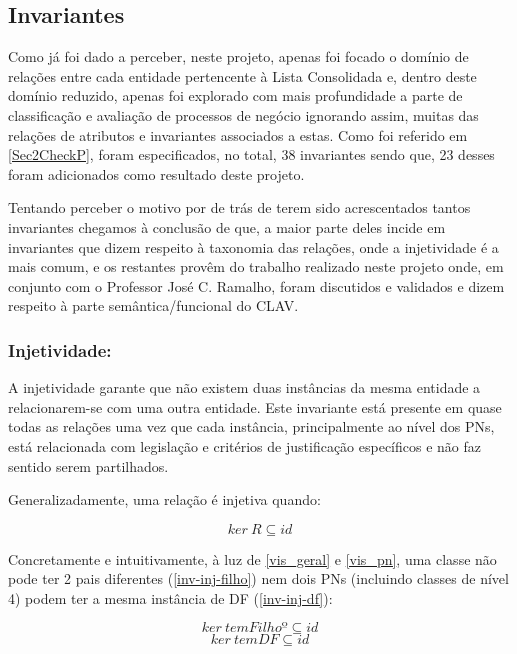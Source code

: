 \documentclass[tikz,runningheads,a4paper]{llncs}
\begin{document}
\subsection{Invariantes} \label{SubSecInv}

Como já foi dado a perceber, neste projeto, apenas foi focado o domínio de relações entre cada entidade pertencente à Lista Consolidada e, dentro deste domínio reduzido, apenas foi explorado com mais profundidade a parte de classificação e avaliação de processos de negócio ignorando assim, muitas das relações de atributos e invariantes associados a estas. Como foi referido em \ref{Sec2CheckP}, foram especificados, no total, 38 invariantes sendo que, 23 desses foram adicionados como resultado deste projeto.

Tentando perceber o motivo por de trás de terem sido acrescentados tantos invariantes chegamos à conclusão de que, a maior parte deles incide em invariantes que dizem respeito à taxonomia das relações, onde a injetividade é a mais comum, e os restantes provêm do trabalho realizado neste projeto onde, em conjunto com o Professor José C. Ramalho, foram discutidos e validados e dizem respeito à parte semântica/funcional do CLAV.

\subsubsection{Injetividade:}

A injetividade garante que não existem duas instâncias da mesma entidade a relacionarem-se com uma outra entidade. Este invariante está presente em quase todas as relações uma vez que cada instância, principalmente ao nível dos PNs, está relacionada com legislação e critérios de justificação específicos e não faz sentido serem partilhados.

Generalizadamente, uma relação é injetiva quando:

\begin{equation}
\label{injetivity}
    ker\ R \subseteq id
\end{equation}

Concretamente e intuitivamente, à luz de \ref{vis_geral} e \ref{vis_pn}, uma classe não pode ter 2 pais diferentes (\ref{inv-inj-filho}) nem dois PNs (incluindo classes de nível 4) podem ter a mesma instância de DF (\ref{inv-inj-df}):

\begin{equation}
    \label{inv-inj-filho}
    ker\ temFilhoº \subseteq id
\end{equation}
\begin{equation}
    \label{inv-inj-df}
    ker\ temDF \subseteq id
\end{equation}
\end{document}
